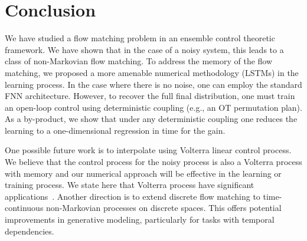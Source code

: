 \documentclass[12pt]{amsart}
\renewcommand{\(}{\left (}
\renewcommand{\)}{\right )}
\numberwithin{equation}{section}
\begin{document}
\section{Conclusion}
We have studied a flow matching problem in an ensemble control theoretic framework. We have shown that in the case of a noisy system, this leads to a class of non-Markovian flow matching. To address the memory of the flow matching, we proposed a more amenable numerical methodology (LSTMs) in the learning process.  In the case where there is no noise, one can employ the standard FNN architecture. However, to recover the full final distribution, one must train an open-loop control using deterministic coupling (e.g., an OT permutation plan). As a by-product, we show that under any deterministic coupling one reduces the learning to a one-dimensional regression in time for the gain.

One possible future work is to interpolate using Volterra linear control process.%
We believe that the control process for the noisy process is also a Volterra process with memory and our numerical approach will be effective in the learning or training process. We state here that Volterra process have significant applications~\cite{NSG-SCM-EWM:71,EZ:21}. Another direction is to extend discrete flow matching \cite{AC-JY-RB-TR-TJ:24,IG-TR-NS-FK-RTC-GS-YL:24} to time-continuous non-Markovian processes on discrete spaces. This offers potential improvements in generative modeling, particularly for tasks with temporal dependencies. %
\end{document}
